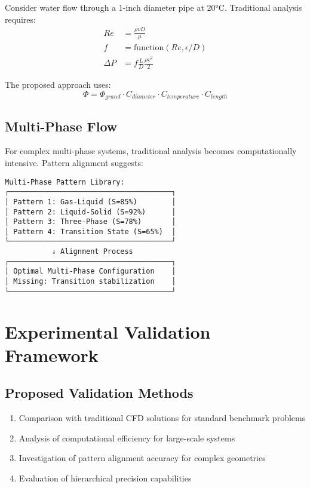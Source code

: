 \documentclass[12pt,a4paper]{article}
\begin{document}
Consider water flow through a 1-inch diameter pipe at 20°C. Traditional analysis requires:
\begin{align}
Re &= \frac{\rho v D}{\mu} \\
f &= \text{function}(Re, \epsilon/D) \\
\Delta P &= f \frac{L}{D} \frac{\rho v^2}{2}
\end{align}

The proposed approach uses:
\begin{equation}
\Phi = \Phi_{grand} \cdot C_{diameter} \cdot C_{temperature} \cdot C_{length}
\end{equation}

\subsection{Multi-Phase Flow}

For complex multi-phase systems, traditional analysis becomes computationally intensive. Pattern alignment suggests:

\begin{verbatim}
Multi-Phase Pattern Library:
┌──────────────────────────────────────┐
│ Pattern 1: Gas-Liquid (S=85%)        │
│ Pattern 2: Liquid-Solid (S=92%)      │
│ Pattern 3: Three-Phase (S=78%)       │
│ Pattern 4: Transition State (S=65%)  │
└──────────────────────────────────────┘
           ↓ Alignment Process
┌──────────────────────────────────────┐
│ Optimal Multi-Phase Configuration    │
│ Missing: Transition stabilization    │
└──────────────────────────────────────┘
\end{verbatim}

\section{Experimental Validation Framework}

\subsection{Proposed Validation Methods}

\begin{enumerate}
\item Comparison with traditional CFD solutions for standard benchmark problems
\item Analysis of computational efficiency for large-scale systems
\item Investigation of pattern alignment accuracy for complex geometries
\item Evaluation of hierarchical precision capabilities
\end{enumerate}
\end{document}
